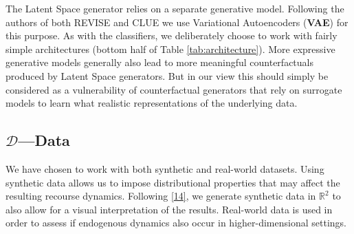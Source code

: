\documentclass[conference,final,]{IEEEtran}
\theoremstyle{definition}
\theoremstyle{definition}
\theoremstyle{definition}
\theoremstyle{definition}
\theoremstyle{remark}
\begin{document}
The Latent Space generator relies on a separate generative model. Following the authors of both REVISE and CLUE we use Variational Autoencoders (\textbf{VAE}) for this purpose. As with the classifiers, we deliberately choose to work with fairly simple architectures (bottom half of Table \ref{tab:architecture}). More expressive generative models generally also lead to more meaningful counterfactuals produced by Latent Space generators. But in our view this should simply be considered as a vulnerability of counterfactual generators that rely on surrogate models to learn what realistic representations of the underlying data.

\begin{table}

\caption{\label{tab:architecture}Neural network architectures and training parameters.}
\centering
{}
\end{table}

\hypertarget{empirical-data}{%
\subsection{\texorpdfstring{\(\mathcal{D}\)---Data}{\textbackslash mathcal\{D\}---Data}}\label{empirical-data}}

We have chosen to work with both synthetic and real-world datasets. Using synthetic data allows us to impose distributional properties that may affect the resulting recourse dynamics. Following \protect\hyperlink{ref-upadhyay2021robust}{{[}14{]}}, we generate synthetic data in \(\mathbb{R}^2\) to also allow for a visual interpretation of the results. Real-world data is used in order to assess if endogenous dynamics also occur in higher-dimensional settings.
\end{document}
